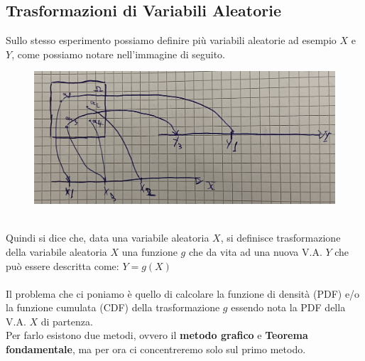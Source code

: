 \documentclass{article}
\begin{document}
\subsection{Trasformazioni di Variabili Aleatorie}
Sullo stesso esperimento possiamo definire più variabili aleatorie ad esempio $X$ e $Y$, come possiamo notare nell'immagine di seguito.
\begin{figure}[ht]
\centering
\includegraphics[scale=0.12]{images/38.Due_VA_un_Esper.jpeg}
\end{figure} ~\\
Quindi si dice che, data una variabile aleatoria $X$, si definisce trasformazione della variabile aleatoria $X$ una funzione $g$ che da vita ad una nuova V.A. $Y$ che può essere descritta come: $Y = g(X)$ \\ \\
Il problema che ci poniamo è quello di calcolare la funzione di densità (PDF) e/o la funzione cumulata (CDF) della trasformazione $g$ essendo nota la PDF della V.A. $X$ di partenza. \\
Per farlo esistono due metodi, ovvero il \textbf{metodo grafico} e \textbf{Teorema fondamentale}, ma per ora ci concentreremo solo sul primo metodo.
\end{document}
